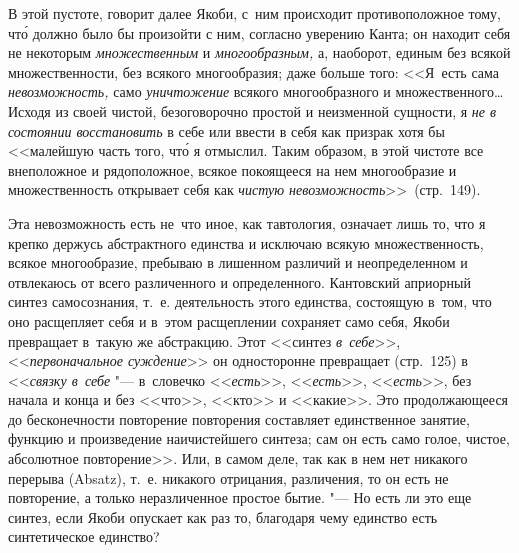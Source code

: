 В этой пустоте, говорит далее Якоби, с~ним происходит противоположное тому,
чт\'{о} должно было бы произойти с ним, согласно уверению Канта; он находит
себя не некоторым {\em множественным} и {\em многообразным,} а, наоборот,
единым без всякой множественности, без всякого многообразия; даже больше того:
<<Я~есть сама {\em невозможность,} само {\em уничтожение} всякого
многообразного и множественного\ldots Исходя из своей чистой, безоговорочно
простой и неизменной сущности, я {\em не в состоянии восстановить} в себе или
ввести в себя как призрак хотя бы <<малейшую часть того, чт\'{о} я отмыслил.
Таким образом, в этой чистоте все внеположное и рядоположное, всякое покоящееся
на нем многообразие и множественность открывает себя как
{\em чистую невозможность}>>~(стр.~149).

Эта невозможность есть не~что иное, как тавтология, означает лишь то, что я
крепко держусь абстрактного единства и исключаю всякую множественность, всякое
многообразие, пребываю в лишенном различий и неопределенном и отвлекаюсь от
всего различенного и определенного. Кантовский априорный синтез самосознания,
т.~е. деятельность этого единства, состоящую в~том, что оно расщепляет себя и
в~этом расщеплении сохраняет само себя, Якоби превращает в~такую же абстракцию.
Этот <<синтез {\em в~себе}>>, <<{\em первоначальное суждение}>> он односторонне
превращает (стр.~125) в <<{\em связку в~себе} "--- в~словечко <<{\em есть}>>,
<<{\em есть}>>, <<{\em есть}>>, без начала и конца и без <<что>>, <<кто>> и
<<какие>>. Это продолжающееся до бесконечности повторение повторения составляет
единственное занятие, функцию и произведение наичистейшего синтеза; сам он есть
само голое, чистое, абсолютное повторение>>. Или, в самом деле, так как в нем
нет никакого перерыва (Ab\-satz), т.~е. никакого отрицания, различения, то он есть не
повторение, а только неразличенное простое бытие. "--- Но есть ли это еще
синтез, если Якоби опускает как раз то, благодаря чему единство есть
синтетическое единство?

